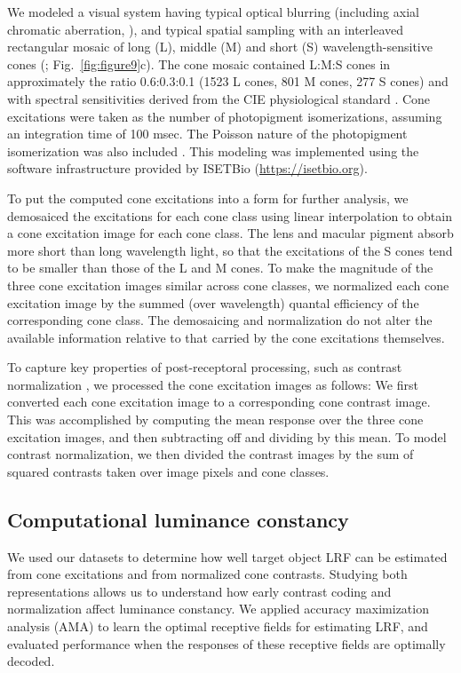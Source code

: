 \documentclass{jov}
\begin{document}
We modeled a visual system having typical optical blurring (including axial chromatic aberration, ), and typical spatial sampling with an interleaved rectangular mosaic of long (L), middle (M)  and short (S) wavelength-sensitive cones (; Fig.~\ref{fig:figure9}c). 
The cone mosaic contained L:M:S cones in approximately the ratio 0.6:0.3:0.1 (1523 L cones, 801 M cones, 277 S cones) and with spectral sensitivities derived from the CIE physiological standard \cite{CIE86}.
Cone excitations were taken as the number of photopigment isomerizations, assuming an integration time of 100 msec. 
The Poisson nature of the photopigment isomerization was also included \cite{hecht1942energy}. 
This modeling was implemented using the software infrastructure provided by ISETBio (\href{https://isetbio.org}{https://isetbio.org}).

To put the computed cone excitations into a form for further analysis, we demosaiced the excitations for each cone class using linear interpolation
to obtain a cone excitation image for each cone class.
The lens and macular pigment absorb more short than long wavelength light, so that the excitations of the S cones tend to be
smaller than those of the L and M cones.
To make the magnitude of the three cone excitation images similar across cone classes, we
normalized each cone excitation image by the summed (over wavelength) quantal efficiency of the corresponding cone class.
The demosaicing and normalization do not alter the available information relative to that carried by the cone excitations themselves. 

To capture key properties of post-receptoral processing, such as contrast normalization \cite{heeger1992normalization,albrecht1991motion,carandini2012normalization}, 
we processed the cone excitation images as follows:
We first converted each cone excitation image to a corresponding cone contrast image.
This was accomplished by computing the mean response over the three cone excitation images, and then subtracting off and dividing by this mean.
To model contrast normalization, we then divided the contrast images by the sum of squared contrasts taken over image pixels and cone classes.

\subsection{Computational luminance constancy} \label{method:SupervisedLearning}
We used our datasets to determine how well target object LRF can be estimated from cone excitations and from normalized cone contrasts.
Studying both representations allows us to understand how early contrast coding and normalization affect luminance constancy.
We applied accuracy maximization analysis (AMA) to learn the optimal receptive fields for estimating LRF,
and evaluated performance when the responses of these receptive fields are optimally decoded.
\end{document}
